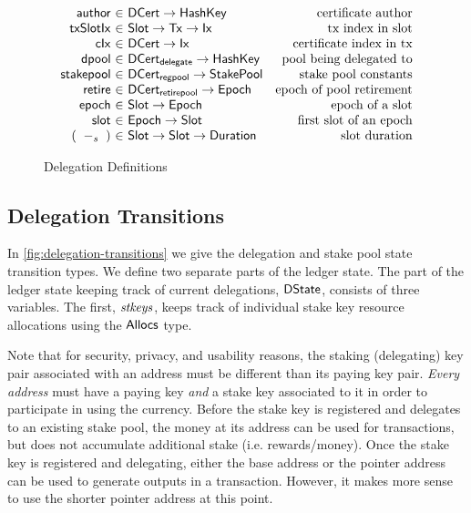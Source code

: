 \begin{figure}
\begin{equation*}
\begin{array}{r@{~\in~}lr}
  \fun{author} & \DCert \to \HashKey
  & \text{certificate author}
  \\
  \fun{txSlotIx} & \Slot \to \Tx \to \Ix
  & \text{tx index in slot}
  \\
  \fun{cIx} & \DCert \to \Ix
  & \text{certificate index in tx}
  \\
  \fun{dpool} & \DCertDeleg \to \HashKey
  & \text{pool being delegated to}
  \\
  \fun{stakepool} & \DCertRegPool \to \StakePool
  & \text{stake pool constants}
  \\
  \fun{retire} & \DCertRetirePool \to \Epoch
  & \text{epoch of pool retirement}
  \\
  \fun{epoch} & \Slot \to \Epoch
  & \text{epoch of a slot}
  \\
  \fun{slot} & \Epoch \to \Slot
  & \text{first slot of an epoch}
  \\
    (\slotminus{}{}) & \Slot \to \Slot \to \Duration
  & \text{slot duration}
  \end{array}
  \end{equation*}

  \caption{Delegation Definitions}
  \label{fig:delegation-definitons}
\end{figure}

\clearpage

\subsection{Delegation Transitions}
\label{sec:deleg-trans}


In \cref{fig:delegation-transitions} we give the delegation and stake pool
state transition types. We define two separate parts of the ledger state.
The part of the ledger state keeping track of current delegations, $\mathsf{DState}$,
consists of three variables. The first, $\mathit{stkeys}$, keeps track of individual
stake key resource allocations using the $\mathsf{Allocs}$ type.

Note that for security, privacy, and usability reasons, the staking (delegating)
key pair associated with an address must be different than its paying key pair.
\textit{Every address} must have a paying key \textit{and} a stake key
associated to it in order to participate in using the currency. Before the
stake key is registered and delegates to an existing stake pool,
the money at its address can be used for
transactions, but does not accumulate additional stake (i.e. rewards/money).
Once the stake key is registered and delegating, either the base address or
the pointer address can be used to generate outputs
in a transaction. However, it makes more sense to use the shorter pointer
address at this point. 

